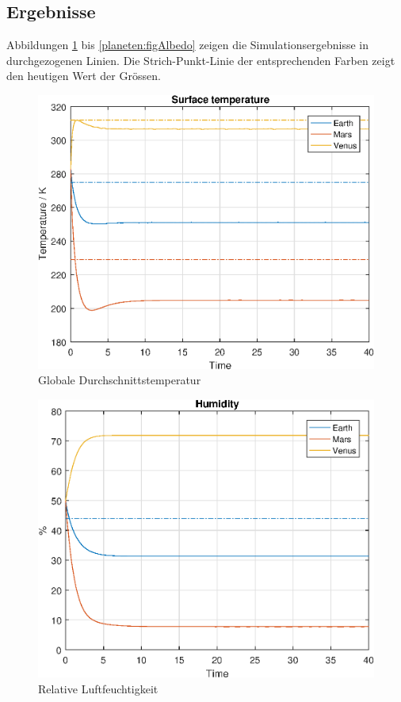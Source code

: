 \begin{refsection}
\subsection{Ergebnisse}

		Abbildungen \ref{planeten:figSurfaceTemperature} bis \ref{planeten:figAlbedo} zeigen die Simulationsergebnisse in durchgezogenen Linien. Die Strich-Punkt-Linie der entsprechenden Farben zeigt den heutigen Wert der Grössen.

		\begin{figure}
			\center
			\includegraphics[height=0.45\textheight]{planeten/Matlab/figures/surfaceTemperature.eps}
			\caption{Globale Durchschnittstemperatur}
			\label{planeten:figSurfaceTemperature}
		\end{figure}
		
		\begin{figure}
			\center
			\includegraphics[height=0.45\textheight]{planeten/Matlab/figures/humidity.eps}
			\caption{Relative Luftfeuchtigkeit}
			\label{planeten:figHumidity}
		\end{figure}
		

\end{refsection}
